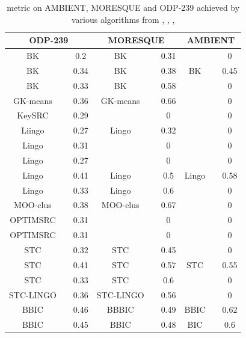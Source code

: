 \documentclass[a4paper, 12pt, oneside]{Thesis} %
\begin{document}
\begin{table}[th]
\centering
\begin{tabular}{|c|c|c|c|c|c|c|c|c|}
\toprule
\multicolumn{3}{c}{ODP-239} &  \multicolumn{3}{c}{MORESQUE} & \multicolumn{3}{c}{AMBIENT}\\
\midrule
BK	& \cite{acharya2014multi}	& 0.2	& BK	& \cite{acharya2014multi}	& 0.31	& 	& 	& 0	\\
BK	& \cite{cobos2014clustering}	& 0.34	& BK	& \cite{cobos2014clustering}	& 0.38	& BK	& \cite{cobos2014clustering}	& 0.45	\\
BK	& \cite{moreno2014easy}	& 0.33	& BK	& \cite{moreno2014easy}	& 0.58	& 	& 	& 0	\\
GK-means	& \cite{acharya2014multi}	& 0.36	& GK-means	& \cite{acharya2014multi}	& 0.66	& 	& 	& 0	\\
KeySRC	& \cite{carpineto2010optimal}	& 0.29	& 	& 	& 0	& 	& 	& 0	\\
Liingo	& \cite{acharya2014multi}	& 0.27	& Lingo	& \cite{acharya2014multi}	& 0.32	& 	& 	& 0	\\
Lingo	& \cite{carpineto2010optimal}	& 0.31	& 	& 	& 0	& 	& 	& 0	\\
Lingo	& \cite{carpineto2010optimal}	& 0.27	& 	& 	& 0	& 	& 	& 0	\\
Lingo	& \cite{cobos2014clustering}	& 0.41	& Lingo	& \cite{cobos2014clustering}	& 0.5	& Lingo	& \cite{cobos2014clustering}	& 0.58	\\
Lingo	& \cite{moreno2014easy}	& 0.33	& Lingo	& \cite{moreno2014easy}	& 0.6	& 	& 	& 0	\\
MOO-clus	& \cite{acharya2014multi}	& 0.38	& MOO-clus	& \cite{acharya2014multi}	& 0.67	& 	& 	& 0	\\
OPTIMSRC	& \cite{acharya2014multi}	& 0.31	& 	& 	& 0	& 	& 	& 0	\\
OPTIMSRC	& \cite{carpineto2010optimal}	& 0.31	& 	& 	& 0	& 	& 	& 0	\\
STC	& \cite{acharya2014multi}	& 0.32	& STC	& \cite{acharya2014multi}	& 0.45	& 	& 	& 0	\\
STC	& \cite{cobos2014clustering}	& 0.41	& STC	& \cite{cobos2014clustering}	& 0.57	& STC	& \cite{cobos2014clustering}	& 0.55	\\
STC	& \cite{moreno2014easy}	& 0.33	& STC	& \cite{moreno2014easy}	& 0.6	& 	& 	& 0	\\
STC-LINGO	& \cite{acharya2014multi}	& 0.36	& STC-LINGO	& \cite{acharya2014multi}	& 0.56	& 	& 	& 0	\\
BBIC	& \cite{cobos2014clustering}	& 0.46	& BBBIC	& \cite{cobos2014clustering}	& 0.49	& BBIC	& \cite{cobos2014clustering}	& 0.62	\\
BBIC	& \cite{cobos2014clustering}	& 0.45	& BBIC	& \cite{cobos2014clustering}	& 0.48	& BIC	& \cite{cobos2014clustering}	& 0.6	\\
\bottomrule
\end{tabular}
\caption{ metric on AMBIENT, MORESQUE and ODP-239 achieved by various algorithms from \cite{carpineto2010optimal}, \cite{cobos2014clustering}, \cite{moreno2014easy}, \cite{acharya2014multi}}
\label{tab:fmeasurevarious}
\end{table}
\end{document}
